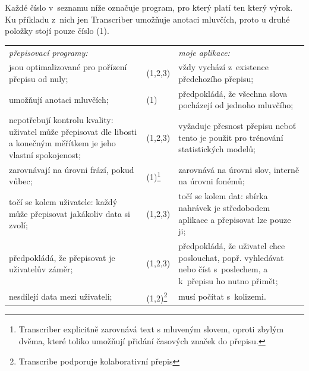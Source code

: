 Každé číslo v~seznamu níže označuje program, pro který platí ten který výrok. Ku
příkladu z~nich jen Transcriber umožňuje anotaci mluvčích, proto u druhé položky
stojí pouze číslo (1).



\noindent
\begin{tabularx}{\textwidth}{
    @{\hspace{1.5em}}%
    >{{\hsize=0.9\hsize}\leavevmode\llap{\textbullet~}\raggedright}%
    X%
    @{\hspace{0.2em}}
    >{\hsize=0.2\hsize}
    X
    @{\quad\hspace{1.5em}}%
    >{\leavevmode\llap{\textbullet~}\raggedright\arraybackslash}%
    X%
    @{}%
  }
  \em{přepisovací programy}: & & \em{moje aplikace}: \\
  jsou optimalizované pro pořízení přepisu od nuly; &
    (1,2,3) &
      vždy vychází z~existence předchozího přepisu; \\

  umožňují anotaci mluvčích; &
    (1) &
      předpokládá, že všechna slova pocházejí od jednoho mluvčího; \\

  nepotřebují kontrolu kvality: uživatel může přepisovat dle libosti a konečným
  měřítkem je jeho vlastní spokojenost; &
    (1,2,3) &
      vyžaduje přesnost přepisu neboť tento je použit pro trénování
      statistických modelů; \\

  zarovnávají na úrovni frází, pokud vůbec; &
    (1)\footnote{
        Transcriber explicitně zarovnává text s mluveným slovem, oproti zbylým
        dvěma, které toliko umožňují přidání časových značek do přepisu.
    } &
      zarovnává na úrovni slov, interně na úrovni fonémů; \\

  točí se kolem uživatele: každý může přepisovat jakákoliv data si zvolí; &
    (1,2,3) &
      točí se kolem dat: sbírka nahrávek je středobodem aplikace a přepisovat
      lze pouze ji; \\

  předpokládá, že přepisovat je uživatelův záměr; &
    (1,2,3) &
      předpokládá, že uživatel chce poslouchat, popř. vyhledávat nebo číst
      s~poslechem, a k~přepisu ho nutno přimět; \\

  nesdílejí data mezi uživateli; &
    (1,2)\footnote{Transcribe podporuje kolaborativní přepis} &
      musí počítat s~kolizemi. \\
\end{tabularx}

